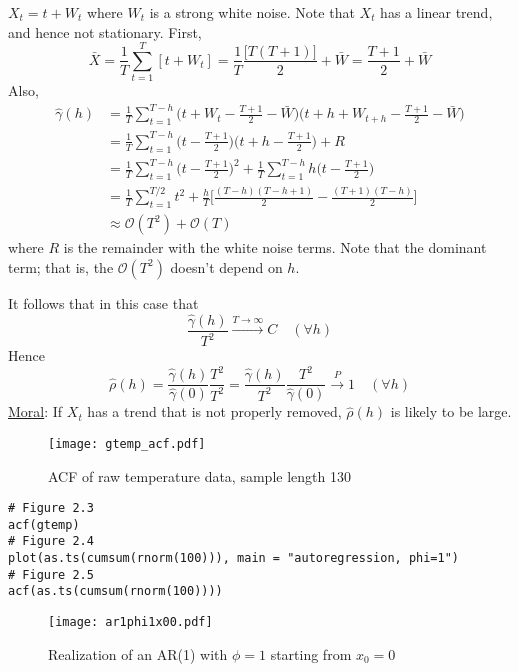 \begin{Example}{}{}
    $ X_t=t+W_t $ where $ W_t $ is a strong white noise. Note that
    $ X_t $ has a linear trend, and hence not stationary.
    First,
    \[ \bar{X}=\frac{1}{T} \sum_{t=1}^{T}[t+W_t]=\frac{1}{T}
        \frac{\bigl[T(T+1)\bigr]}{2}+\bar{W}=\frac{T+1}{2} +\bar{W}  \]
    Also,
    \begin{align*}
        \hat{\gamma}(h)
         & =\frac{1}{T} \sum_{t=1}^{T-h}\biggl(t+W_t-\frac{T+1}{2} -\bar{W}\biggr)\biggl(t+h+W_{t+h}-\frac{T+1}{2}-\bar{W}\biggr)        \\
         & =\frac{1}{T} \sum_{t=1}^{T-h}\biggl(t-\frac{T+1}{2}\biggr)\biggl(t+h-\frac{T+1}{2}\biggr)+R                                   \\
         & =\frac{1}{T} \sum_{t=1}^{T-h} \biggl(t-\frac{T+1}{2}\biggr)^{\!2}+\frac{1}{T} \sum_{t=1}^{T-h} h\biggl(t-\frac{T+1}{2}\biggr) \\
         & =\frac{1}{T} \sum_{t=1}^{T/2} t^2+\frac{h}{T} \biggl[\frac{(T-h)(T-h+1)}{2}-\frac{(T+1)(T-h)}{2} \biggr]                      \\
         & \approx \mathcal{O}(T^2)+\mathcal{O}(T)
    \end{align*}
    where $ R $ is the remainder with the white noise terms. Note that
    the dominant term; that is, the $ \mathcal{O}(T^2) $ doesn't depend on $ h $.

    It follows that in this case that
    \[ \frac{\hat{\gamma}(h)}{T^2}\xrightarrow{T\to\infty} C\quad(\forall h)  \]
    Hence
    \[ \hat{\rho}(h)=\frac{\hat{\gamma}(h)}{\hat{\gamma}(0)}\frac{T^2}{T^2}=\frac{\hat{\gamma}(h)}{T^2}\frac{T^2}{\hat{\gamma}(0)}  \stackrel{P}{\to}1\quad(\forall h)  \]
    \underline{Moral}: If $ X_t $ has a trend that is not properly removed,
    $ \hat{\rho}(h) $ is likely to be large.
\end{Example}
\begin{figure}[!htbp]
    \centering
    \texttt{[image: gtemp\_acf.pdf]}
    \caption{ACF of raw temperature data, sample length 130}\label{fig:gtemp_acf}
\end{figure}
\begin{verbatim}
# Figure 2.3
acf(gtemp)
# Figure 2.4
plot(as.ts(cumsum(rnorm(100))), main = "autoregression, phi=1")
# Figure 2.5
acf(as.ts(cumsum(rnorm(100))))
\end{verbatim}
\begin{figure}[!htbp]
    \centering
    \texttt{[image: ar1phi1x00.pdf]}
    \caption{Realization of an AR(1) with $ \phi=1 $ starting from
        $ x_0=0 $}\label{fig:ar1phi1x00}
\end{figure}
